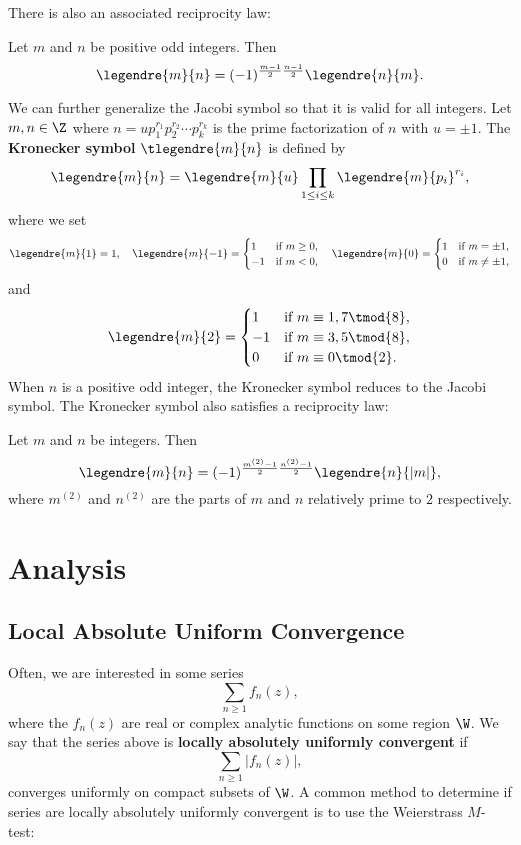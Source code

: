     There is also an associated reciprocity law:
    \begin{proposition}
      Let $m$ and $n$ be positive odd integers. Then
      \[
        \legendre{m}{n} = (-1)^{\frac{m-1}{2}\frac{n-1}{2}}\legendre{n}{m}.
      \]
    \end{proposition}
    We can further generalize the Jacobi symbol so that it is valid for all integers. Let $m,n \in \Z$ where $n = up_{1}^{r_{1}}p_{2}^{r_{2}} \cdots p_{k}^{r_{k}}$ is the prime factorization of $n$ with $u = \pm1$. The \textbf{Kronecker symbol} $\tlegendre{m}{n}$ is defined by
    \[
      \legendre{m}{n} = \legendre{m}{u}\prod_{1 \le i \le k}\legendre{m}{p_{i}}^{r_{i}},
    \]
    where we set
    \[
      \legendre{m}{1} = 1, \quad \legendre{m}{-1} = \begin{cases} 1 & \text{if $m \ge 0$}, \\ -1 & \text{if $m < 0$}, \end{cases} \quad \legendre{m}{0} = \begin{cases} 1 & \text{if $m = \pm 1$}, \\ 0 & \text{if $m \neq \pm 1$}, \end{cases}
    \]
    and
    \[
      \legendre{m}{2} = \begin{cases} 1 & \text{if $m \equiv 1,7 \tmod{8}$}, \\ -1 & \text{if $m \equiv 3,5 \tmod{8}$}, \\ 0 & \text{if $m \equiv 0 \tmod{2}$}. \end{cases}
    \]
    When $n$ is a positive odd integer, the Kronecker symbol reduces to the Jacobi symbol. The Kronecker symbol also satisfies a reciprocity law:
    \begin{proposition}
      Let $m$ and $n$ be integers. Then
      \[
        \legendre{m}{n} = (-1)^{\frac{m^{(2)}-1}{2}\frac{n^{(2)}-1}{2}}\legendre{n}{|m|},
      \]
      where $m^{(2)}$ and $n^{(2)}$ are the parts of $m$ and $n$ relatively prime to $2$ respectively.
    \end{proposition}
\chapter{Analysis}
  \section{Local Absolute Uniform Convergence}
    Often, we are interested in some series
    \[
      \sum_{n \ge 1}f_{n}(z),
    \]
    where the $f_{n}(z)$ are real or complex analytic functions on some region $\W$. We say that the series above is \textbf{locally absolutely uniformly convergent} if
    \[
      \sum_{n \ge 1}|f_{n}(z)|,
    \]
    converges uniformly on compact subsets of $\W$. A common method to determine if series are locally absolutely uniformly convergent is to use the Weierstrass $M$-test:

